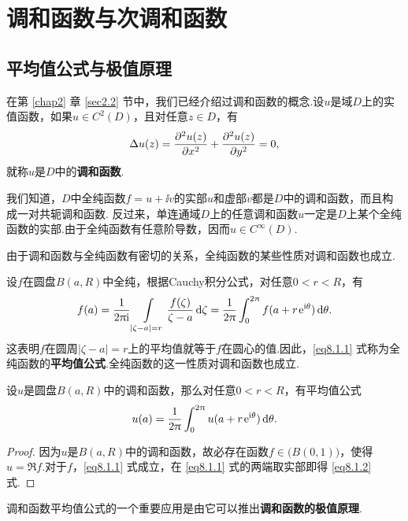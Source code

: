\chapter{调和函数与次调和函数\label{chap8}}
\section{平均值公式与极值原理\label{sec8.1}}
在第 \ref{chap2} 章 \ref{sec2.2} 节中，我们已经介绍过调和函数的概念.设$u$是域$D$上的实值函数，如果$u\in C^2(D)$，且对任意$z\in D$，有
\[\Delta u(z)=\frac{\partial^2 u(z)}{\partial x^2}+\frac{\partial^2 u(z)}{\partial y^2}=0,\]
就称$u$是$D$中的\textbf{调和函数}.

我们知道，$D$中全纯函数$f=u+\ii v$的实部$u$和虚部$v$都是$D$中的调和函数，而且构成一对共轭调和函数. 反过来，单连通域$D$上的任意调和函数$u$一定是$D$上某个全纯函数的实部.由于全纯函数有任意阶导数，因而$u\in C^\infty(D)$.

由于调和函数与全纯函数有密切的关系，全纯函数的某些性质对调和函数也成立.

设$f$在圆盘$B(a,R)$中全纯，根据Cauchy积分公式，对任意$0<r<R$，有
\begin{equation}\label{eq8.1.1}
f(a)=\frac1{2\uppi\mathrm i}\int\limits_{|\zeta-a|=r}\frac{f(\zeta)}{\zeta-a}\mathop{}\!\mathrm{d} \zeta
=\frac1{2\uppi}\int_0^{2\uppi}f(a+r\operatorname{\!\!\;\mathrm e}^{\mathrm i\theta})\mathop{}\!\mathrm{d} \theta.
\end{equation}
这表明$f$在圆周$|\zeta-a|=r$上的平均值就等于$f$在圆心的值.因此，\eqref{eq8.1.1} 式称为全纯函数的\textbf{平均值公式}.全纯函数的这一性质对调和函数也成立.

\begin{theorem}\label{thm8.1.1}
设$u$是圆盘$B(a,R)$中的调和函数，那么对任意$0<r<R$，有平均值公式
\begin{equation}\label{eq8.1.2}
u(a)=\frac1{2\uppi}\int_0^{2\uppi}u(a+r\operatorname{\!\!\;\mathrm e}^{\mathrm i\theta})\mathop{}\!\mathrm{d} \theta.
\end{equation}
\end{theorem}
\begin{proof}
因为$u$是$B(a,R)$中的调和函数，故必存在函数$f\in\big(B(0,1)\big)$，使得$u=\Re f$.对于$f$，\eqref{eq8.1.1} 式成立，在 \eqref{eq8.1.1} 式的两端取实部即得 \eqref{eq8.1.2} 式.
\end{proof}

调和函数平均值公式的一个重要应用是由它可以推出\textbf{调和函数的极值原理}.


